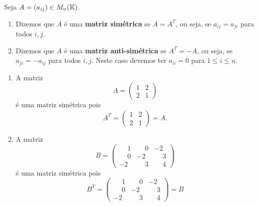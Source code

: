\begin{definicao}
    Seja $A = (a_{ij})\in M_n(\mathbb{K})$.
    \begin{enumerate}[label={\roman*})]
        \item Dizemos que $A$ é uma \textbf{matriz simétrica} se $A = A^T$, ou seja, se $a_{ij} = a_{ji}$ para todos $i, j$.
        \item Dizemos que $A$ é uma \textbf{matriz anti-simétrica} se $A^T = -A$, ou seja, se $a_{ji} =
            -a_{ij}$ para todos $i, j$. Neste caso devemos ter $a_{ii} = 0$ para $1 \le i \le n$.
    \end{enumerate}
\end{definicao}

\begin{exemplos}
    \begin{enumerate}[label={\arabic*})]
        \item A matriz
            \[
                A = \begin{pmatrix}
                    1 & 2\\
                    2 & 1
                \end{pmatrix}
            \]
            é uma matriz simétrica pois
            \[
                A^T = \begin{pmatrix}
                    1 & 2\\
                    2 & 1
                \end{pmatrix} = A.
            \]

        \item A matriz
            \[
                B = \begin{pmatrix}
                    \phantom{-}1 & \phantom{-}0 & -2\\
                    \phantom{-}0 & -2 & \phantom{-}3\\
                    -2 & \phantom{-}3 & \phantom{-}4
                \end{pmatrix}
            \]
            é uma matriz simétrica pois
            \[
                B^T = \begin{pmatrix}
                    \phantom{-}1 & \phantom{-}0 & -2\\
                    \phantom{-}0 & -2 & \phantom{-}3\\
                    -2 & \phantom{-}3 & \phantom{-}4
                \end{pmatrix} = B
            \]


\end{enumerate}
\end{exemplos}

